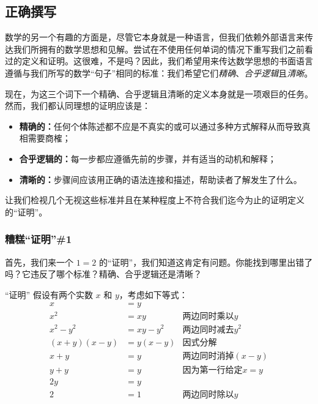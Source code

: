 \subsection{正确撰写}

数学的另一个有趣的方面是，尽管它本身就是一种语言，但我们依赖外部语言来传达我们所拥有的数学思想和见解。尝试在不使用任何单词的情况下重写我们之前看过的定义和证明。这很难，不是吗？因此，我们希望用来传达数学思想的书面语言遵循与我们所写的数学``句子''相同的标准：我们希望它们\emph{精确}、\emph{合乎逻辑}且\emph{清晰}。

现在，为这三个词下一个精确、合乎逻辑且清晰的定义本身就是一项艰巨的任务。然而，我们都认同理想的证明应该是：

\begin{itemize}
    \item \textbf{精确的：}任何个体陈述都不应是不真实的或可以通过多种方式解释从而导致真相需要商榷；
    \item \textbf{合乎逻辑的：}每一步都应遵循先前的步骤，并有适当的动机和解释；
    \item \textbf{清晰的：}步骤间应该用正确的语法连接和描述，帮助读者了解发生了什么。
\end{itemize}

让我们检视几个无视这些标准并且在某种程度上不符合我们迄今为止的证明定义的``证明''。

\subsubsection*{糟糕``证明''\#1}

首先，我们来一个 $1=2$ 的``证明''，我们知道这肯定有问题。你能找到哪里出错了吗？它违反了哪个标准？精确、合乎逻辑还是清晰？

\begin{proofs}{``证明''}
    假设有两个实数 $x$ 和 $y$，考虑如下等式：
    \begin{align*}
        x &= y \\
        x^2 &= xy &\text{两边同时乘以} y\\
        x^2-y^2 &= xy-y^2 &\text{两边同时减去} y^2\\
        (x+y)(x-y) &= y(x-y) &\text{因式分解} \\
        x + y &= y &\text{两边同时消掉} (x-y)\\
        y + y &= y &\text{因为第一行给定} x=y\\ 
        2y &= y \\
        2 &= 1 &\text{两边同时除以} y
    \end{align*}
\end{proofs}

